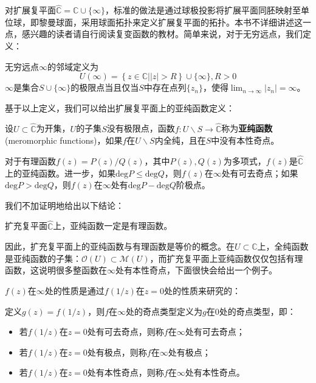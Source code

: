 对扩展复平面$\hat{\mathbb{C}}=\mathbb{C}\cup\{\infty\}$，标准的做法是通过球极投影将扩展平面同胚映射至单位球，即黎曼球面，采用球面拓扑来定义扩展复平面的拓扑。本书不详细讲述这一点，感兴趣的读者请自行阅读复变函数的教材。简单来说，对于无穷远点，我们定义：
\begin{definition}[无穷远点的邻域]
    无穷远点$\infty$的邻域定义为
    \[U(\infty)=\left\{\left.z\in\mathbb{C} \right||z|>R\right\}\cup\{\infty\},R>0\]
    $\infty$是集合$S\cup\{\infty\}$的极限点当且仅当$S$中存在点列$\{z_n\}$，使得$\lim_{n\to\infty}|z_n|=\infty$。
\end{definition}
基于以上定义，我们可以给出扩展复平面上的亚纯函数定义：
\begin{definition}[扩展复平面上的亚纯函数]
    设$U\subset\hat{\mathbb{C}}$为开集，$U$的子集$S$没有极限点，函数$f:U\backslash S\to\hat{\mathbb{C}}$称为\textbf{亚纯函数}(meromorphic functions)，如果$f$在$U\backslash S$内全纯，且在$S$中没有本性奇点。
\end{definition}
\begin{example}
    对于有理函数$f(z)=P(z)/Q(z)$，其中$P(z),Q(z)$为多项式，$f(z)$是$\hat{\mathbb{C}}$上的亚纯函数。进一步，如果$\mathrm{deg}P\leq\mathrm{deg}Q$，则$f(z)$在$\infty$处有可去奇点；如果$\mathrm{deg}P>\mathrm{deg}Q$，则$f(z)$在$\infty$处有$\mathrm{deg}P-\mathrm{deg}Q$阶极点。
\end{example}
我们不加证明地给出以下结论\cite{Function_Theory}：
\begin{claim}
    扩充复平面$\hat{\mathbb{C}}$上，亚纯函数一定是有理函数。
\end{claim}
因此，扩充复平面上的亚纯函数与有理函数是等价的概念。在$U\subset\mathbb{C}$上，全纯函数是亚纯函数的子集：$\mathcal{O}(U)\subset\mathcal{M}(U)$，而扩充复平面上亚纯函数仅仅包括有理函数，这说明很多整函数在$\infty$处有本性奇点，下面很快会给出一个例子。

$f(z)$在$\infty$处的性质是通过$f(1/z)$在$z=0$处的性质来研究的：
\begin{definition}[无穷远点的奇点类型]
    定义$g(z)=f(1/z)$，则$f$在$\infty$处的奇点类型定义为$g$在$0$处的奇点类型，即：
    \begin{itemize}
        \item 若$f(1/z)$在$z=0$处有可去奇点，则称$f$在$\infty$处有可去奇点；
        \item 若$f(1/z)$在$z=0$处有极点，则称$f$在$\infty$处有极点；
        \item 若$f(1/z)$在$z=0$处有本性奇点，则称$f$在$\infty$处有本性奇点。
    \end{itemize}
\end{definition}

